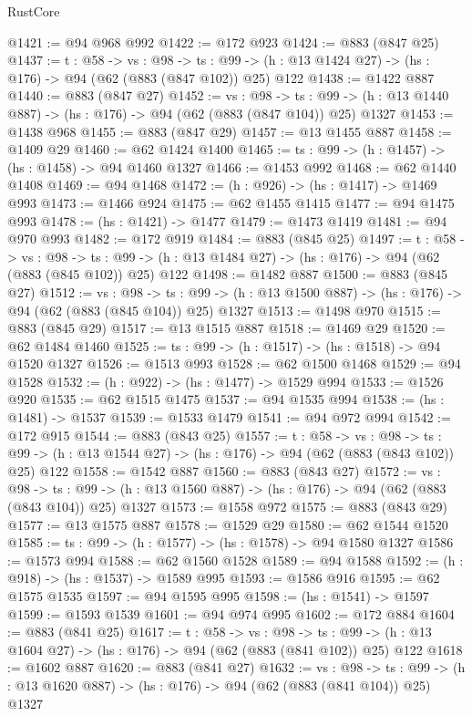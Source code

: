 \begin{lexlean}{RustCore}
\begin{coremodule}
@1421 := @94 @968 @992
@1422 := @172 @923
@1424 := @883 (@847 @25)
@1437 := {t : @58} ->
  {vs : @98} ->
  {ts : @99} -> (h : @13 @1424 @27) -> (hs : @176) -> @94 (@62 (@883 (@847 @102)) @25) @122
@1438 := @1422 @887
@1440 := @883 (@847 @27)
@1452 := {vs : @98} ->
  {ts : @99} -> (h : @13 @1440 @887) -> (hs : @176) -> @94 (@62 (@883 (@847 @104)) @25) @1327
@1453 := @1438 @968
@1455 := @883 (@847 @29)
@1457 := @13 @1455 @887
@1458 := @1409 @29
@1460 := @62 @1424 @1400
@1465 := {ts : @99} -> (h : @1457) -> (hs : @1458) -> @94 @1460 @1327
@1466 := @1453 @992
@1468 := @62 @1440 @1408
@1469 := @94 @1468
@1472 := (h : @926) -> (hs : @1417) -> @1469 @993
@1473 := @1466 @924
@1475 := @62 @1455 @1415
@1477 := @94 @1475 @993
@1478 := (hs : @1421) -> @1477
@1479 := @1473 @1419
@1481 := @94 @970 @993
@1482 := @172 @919
@1484 := @883 (@845 @25)
@1497 := {t : @58} ->
  {vs : @98} ->
  {ts : @99} -> (h : @13 @1484 @27) -> (hs : @176) -> @94 (@62 (@883 (@845 @102)) @25) @122
@1498 := @1482 @887
@1500 := @883 (@845 @27)
@1512 := {vs : @98} ->
  {ts : @99} -> (h : @13 @1500 @887) -> (hs : @176) -> @94 (@62 (@883 (@845 @104)) @25) @1327
@1513 := @1498 @970
@1515 := @883 (@845 @29)
@1517 := @13 @1515 @887
@1518 := @1469 @29
@1520 := @62 @1484 @1460
@1525 := {ts : @99} -> (h : @1517) -> (hs : @1518) -> @94 @1520 @1327
@1526 := @1513 @993
@1528 := @62 @1500 @1468
@1529 := @94 @1528
@1532 := (h : @922) -> (hs : @1477) -> @1529 @994
@1533 := @1526 @920
@1535 := @62 @1515 @1475
@1537 := @94 @1535 @994
@1538 := (hs : @1481) -> @1537
@1539 := @1533 @1479
@1541 := @94 @972 @994
@1542 := @172 @915
@1544 := @883 (@843 @25)
@1557 := {t : @58} ->
  {vs : @98} ->
  {ts : @99} -> (h : @13 @1544 @27) -> (hs : @176) -> @94 (@62 (@883 (@843 @102)) @25) @122
@1558 := @1542 @887
@1560 := @883 (@843 @27)
@1572 := {vs : @98} ->
  {ts : @99} -> (h : @13 @1560 @887) -> (hs : @176) -> @94 (@62 (@883 (@843 @104)) @25) @1327
@1573 := @1558 @972
@1575 := @883 (@843 @29)
@1577 := @13 @1575 @887
@1578 := @1529 @29
@1580 := @62 @1544 @1520
@1585 := {ts : @99} -> (h : @1577) -> (hs : @1578) -> @94 @1580 @1327
@1586 := @1573 @994
@1588 := @62 @1560 @1528
@1589 := @94 @1588
@1592 := (h : @918) -> (hs : @1537) -> @1589 @995
@1593 := @1586 @916
@1595 := @62 @1575 @1535
@1597 := @94 @1595 @995
@1598 := (hs : @1541) -> @1597
@1599 := @1593 @1539
@1601 := @94 @974 @995
@1602 := @172 @884
@1604 := @883 (@841 @25)
@1617 := {t : @58} ->
  {vs : @98} ->
  {ts : @99} -> (h : @13 @1604 @27) -> (hs : @176) -> @94 (@62 (@883 (@841 @102)) @25) @122
@1618 := @1602 @887
@1620 := @883 (@841 @27)
@1632 := {vs : @98} ->
  {ts : @99} -> (h : @13 @1620 @887) -> (hs : @176) -> @94 (@62 (@883 (@841 @104)) @25) @1327

\end{coremodule}
\end{lexlean}
